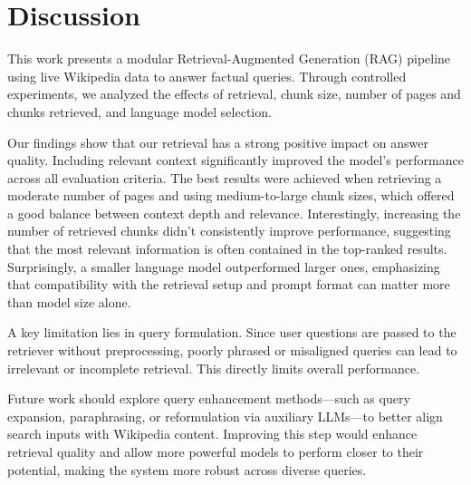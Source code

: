 \documentclass[fleqn,moreauthors,10pt]{ds_report}
\begin{document}
\section*{Discussion}

This work presents a modular Retrieval-Augmented Generation (RAG) pipeline using live Wikipedia data to answer factual queries. Through controlled experiments, we analyzed the effects of retrieval, chunk size, number of pages and chunks retrieved, and language model selection.

Our findings show that our retrieval has a strong positive impact on answer quality. Including relevant context significantly improved the model’s performance across all evaluation criteria. The best results were achieved when retrieving a moderate number of pages and using medium-to-large chunk sizes, which offered a good balance between context depth and relevance. Interestingly, increasing the number of retrieved chunks didn’t consistently improve performance, suggesting that the most relevant information is often contained in the top-ranked results. Surprisingly, a smaller language model outperformed larger ones, emphasizing that compatibility with the retrieval setup and prompt format can matter more than model size alone.

A key limitation lies in query formulation. Since user questions are passed to the retriever without preprocessing, poorly phrased or misaligned queries can lead to irrelevant or incomplete retrieval. This directly limits overall performance.

Future work should explore query enhancement methods—such as query expansion, paraphrasing, or reformulation via auxiliary LLMs—to better align search inputs with Wikipedia content. Improving this step would enhance retrieval quality and allow more powerful models to perform closer to their potential, making the system more robust across diverse queries.




\end{document}
